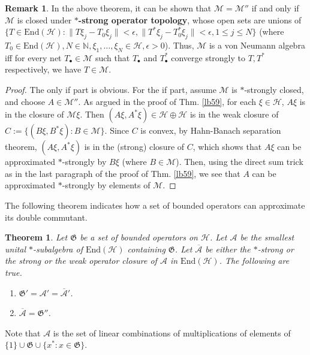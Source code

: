 \documentclass[12pt,a4paper,notitlepage]{article}
\theoremstyle{definition}
\newtheorem{rem}[df]{Remark}
\theoremstyle{plain}
\newtheorem{thm}[df]{Theorem}
\newcommand{\fk}{\mathfrak}
\newcommand{\mc}{\mathcal}
\newcommand{\ovl}{\overline}
\newcommand{\End}{\mathrm{End}} %
\newcommand{\blt}{\bullet}
\newcommand{\Nbb}{\mathbb N}
\numberwithin{equation}{section}
\begin{document}
\begin{rem}
In the above theorem, it can be shown that $\mc M=\mc M''$ if and only if $\mc M$ is closed under \textbf{$*$-strong operator topology}, whose open sets are unions of $\{T\in\End(\mc H):\lVert T\xi_j-T_0\xi_j\lVert<\epsilon, \lVert T^*\xi_j-T_0^*\xi_j\lVert<\epsilon,1\leq j\leq N\}$ (where $T_0\in\End(\mc H),N\in\Nbb,\xi_1,\dots,\xi_N\in\mc H,\epsilon>0$). Thus, $\mc M$ is a von Neumann algebra iff for every net $T_\blt\in\mc M$ such that $T_\blt$ and $T_\blt^*$ converge strongly to $T,T^*$ respectively, we have $T\in\mc M$.
\end{rem}

\begin{proof}
The only if part is obvious. For the if part, assume $\mc M$ is $*$-strongly closed, and choose $A\in\mc M''$. As argued in the proof of Thm. \ref{lb59}, for each $\xi\in\mc H$, $A\xi$ is in the closure of $\mc M\xi$. Then $(A\xi,A^*\xi)\in\mc H\oplus\mc H$ is in the weak closure of $C:=\{(B\xi,B^*\xi):B\in\mc M\}$. Since $C$ is convex, by Hahn-Banach separation theorem, $(A\xi,A^*\xi)$ is in the (strong) closure of $C$, which shows that $A\xi$ can be approximated $*$-strongly by $B\xi$ (where $B\in\mc M$). Then, using the direct sum trick as in the last paragraph of the proof of Thm. \ref{lb59}, we see that $A$ can be approximated $*$-strongly by elements of $\mc M$.
\end{proof}









The following theorem indicates how a set of bounded operators can approximate its double commutant.

\begin{thm}\label{lb60}
Let $\fk G$ be a set of bounded operators on $\mc H$. Let $\mc A$ be the smallest unital $*$-subalgebra of $\End(\mc H)$ containing $\fk G$. Let $\ovl{\mc A}$ be either the $*$-strong or the strong or the weak operator closure of $\mc A$ in $\End(\mc H)$. The following are true.
\begin{enumerate}
\item $\fk G'=\mc A'=\ovl{\mc A}'$.
\item $\ovl{\mc A}=\fk G''$.
\end{enumerate} 
\end{thm}
Note that $\mc A$ is the set of linear combinations of multiplications of elements of $\{1\}\cup\fk G\cup\{x^*:x\in\fk G\}$.
\end{document}

